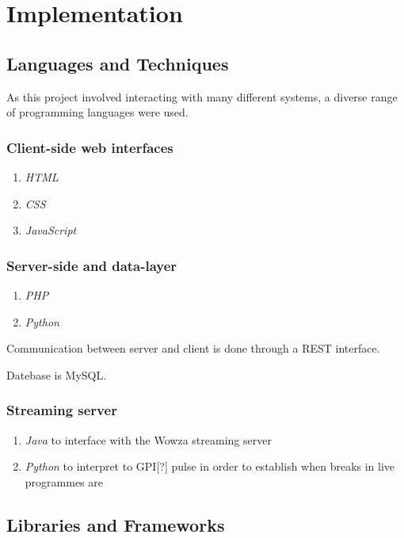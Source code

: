 \section{Implementation}

\subsection{Languages and Techniques}
As this project involved interacting with many different systems, a diverse range of programming languages were used.

\subsubsection{Client-side web interfaces}
\begin{enumerate}
\item \textit{HTML}
\item \textit{CSS}
\item \textit{JavaScript}
\end{enumerate}

\subsubsection{Server-side and data-layer}
\begin{enumerate}
\item \textit{PHP}
\item \textit{Python}
\end{enumerate}

Communication between server and client is done through a REST interface.

Datebase is MySQL.

\subsubsection{Streaming server}
\begin{enumerate}
\item \textit{Java} to interface with the Wowza streaming server
\item \textit{Python} to interpret to GPI[?] pulse in order to establish when breaks in live programmes are
\end{enumerate}

\subsection{Libraries and Frameworks}

